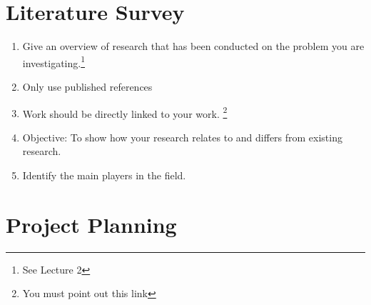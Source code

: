 \documentclass[runningheads,a4paper]{llncs}
\begin{document}
\section{Literature Survey}

\begin{enumerate}
 \item Give an overview of research that has been conducted on the problem you are investigating.\footnote{See Lecture 2}
 \item Only use published references
 \item Work should be directly linked to your work. \footnote{You must point out this link}
 \item Objective: To show how your research relates to and differs from existing research.
 \item Identify the main players in the field.
\end{enumerate}


\section{Project Planning}
\end{document}
